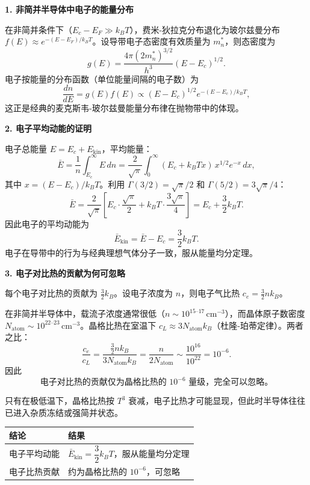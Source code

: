 \begin{derivationbox}[标准解题过程]
\textbf{1. 非简并半导体中电子的能量分布}

在非简并条件下（$E_c-E_F\gg k_BT$），费米-狄拉克分布退化为玻尔兹曼分布 $f(E)\approx e^{-(E-E_F)/k_BT}$。设导带电子态密度有效质量为 $m_n^*$，则态密度为
\[
g(E)=\frac{4\pi(2m_n^*)^{3/2}}{h^3}(E-E_c)^{1/2}.
\]
电子按能量的分布函数（单位能量间隔的电子数）为
\[
\frac{dn}{dE}=g(E)f(E)\propto(E-E_c)^{1/2}e^{-(E-E_c)/k_BT},
\]
这正是经典的麦克斯韦-玻尔兹曼能量分布律在抛物带中的体现。

\textbf{2. 电子平均动能的证明}

电子总能量 $E=E_c+E_{\text{kin}}$，平均能量：
\[
\bar{E}=\frac{1}{n}\int_{E_c}^\infty E\,dn=\frac{2}{\sqrt{\pi}}\int_0^\infty(E_c+k_BTx)\,x^{1/2}e^{-x}\,dx,
\]
其中 $x=(E-E_c)/k_BT$。利用 $\Gamma(3/2)=\sqrt{\pi}/2$ 和 $\Gamma(5/2)=3\sqrt{\pi}/4$：
\[
\bar{E}=\frac{2}{\sqrt{\pi}}\left[E_c\cdot\frac{\sqrt{\pi}}{2}+k_BT\cdot\frac{3\sqrt{\pi}}{4}\right]=E_c+\frac{3}{2}k_BT.
\]
因此电子的平均动能为
\begin{equation}
\boxed{\bar{E}_{\text{kin}}=\bar{E}-E_c=\frac{3}{2}k_BT.}
\end{equation}
电子在导带中的行为与经典理想气体分子一致，服从能量均分定理。

\textbf{3. 电子对比热的贡献为何可忽略}

每个电子对比热的贡献为 $\frac{3}{2}k_B$。设电子浓度为 $n$，则电子气比热 $c_e=\frac{3}{2}nk_B$。

在非简并半导体中，载流子浓度通常很低（$n\sim10^{15\text{--}17}\,\text{cm}^{-3}$），而晶体原子数密度 $N_{\text{atom}}\sim10^{22\text{--}23}\,\text{cm}^{-3}$。晶格比热在室温下 $c_L\approx3N_{\text{atom}}k_B$（杜隆-珀蒂定律）。两者之比：
\[
\frac{c_e}{c_L}=\frac{\frac{3}{2}nk_B}{3N_{\text{atom}}k_B}=\frac{n}{2N_{\text{atom}}}\sim\frac{10^{16}}{10^{22}}=10^{-6}.
\]
因此
\begin{equation}
\boxed{\text{电子对比热的贡献仅为晶格比热的 }10^{-6}\text{ 量级，完全可以忽略。}}
\end{equation}

只有在极低温下，晶格比热按 $T^3$ 衰减，电子比热才可能显现，但此时半导体往往已进入杂质冻结或强简并状态。
\end{derivationbox}

\begin{formulabox}[答案汇总]
\begin{center}
\begin{tabular}{ll}
\toprule
\textbf{结论} & \textbf{结果} \\
\midrule
电子平均动能 & $\bar{E}_{\text{kin}}=\dfrac{3}{2}k_BT$，服从能量均分定理 \\
电子比热贡献 & 约为晶格比热的 $10^{-6}$，可忽略 \\
\bottomrule
\end{tabular}
\end{center}
\end{formulabox}

